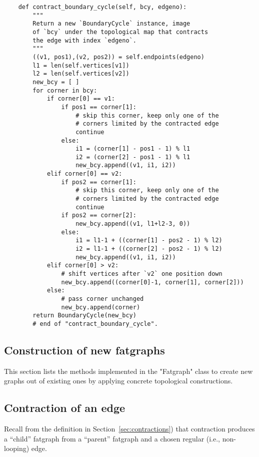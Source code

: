 \begin{lstlisting}
    def contract_boundary_cycle(self, bcy, edgeno):
        """
        Return a new `BoundaryCycle` instance, image 
        of `bcy` under the topological map that contracts 
        the edge with index `edgeno`.
        """
        ((v1, pos1),(v2, pos2)) = self.endpoints(edgeno)
        l1 = len(self.vertices[v1])
        l2 = len(self.vertices[v2])
        new_bcy = [ ]
        for corner in bcy:
            if corner[0] == v1:
                if pos1 == corner[1]:
                    # skip this corner, keep only one of the
                    # corners limited by the contracted edge
                    continue
                else: 
                    i1 = (corner[1] - pos1 - 1) % l1
                    i2 = (corner[2] - pos1 - 1) % l1
                    new_bcy.append((v1, i1, i2))
            elif corner[0] == v2:
                if pos2 == corner[1]:
                    # skip this corner, keep only one of the
                    # corners limited by the contracted edge
                    continue
                if pos2 == corner[2]:
                    new_bcy.append((v1, l1+l2-3, 0))
                else:
                    i1 = l1-1 + ((corner[1] - pos2 - 1) % l2)
                    i2 = l1-1 + ((corner[2] - pos2 - 1) % l2)
                    new_bcy.append((v1, i1, i2))
            elif corner[0] > v2:
                # shift vertices after `v2` one position down
                new_bcy.append((corner[0]-1, corner[1], corner[2]))
            else:
                # pass corner unchanged
                new_bcy.append(corner)
        return BoundaryCycle(new_bcy)
        # end of "contract_boundary_cycle".

\end{lstlisting}

\subsection{Construction of new fatgraphs}
\label{sec:construction}

This section lists the methods implemented in the "Fatgraph" class to
create new graphs out of existing ones by applying concrete
topological constructions.

\subsection{Contraction of an edge}
\label{sec:contract}

Recall from the definition in Section~\ref{sec:contractions}) that
contraction produces a ``child'' fatgraph from a ``parent'' fatgraph
and a chosen regular (i.e., non-looping) edge. 

